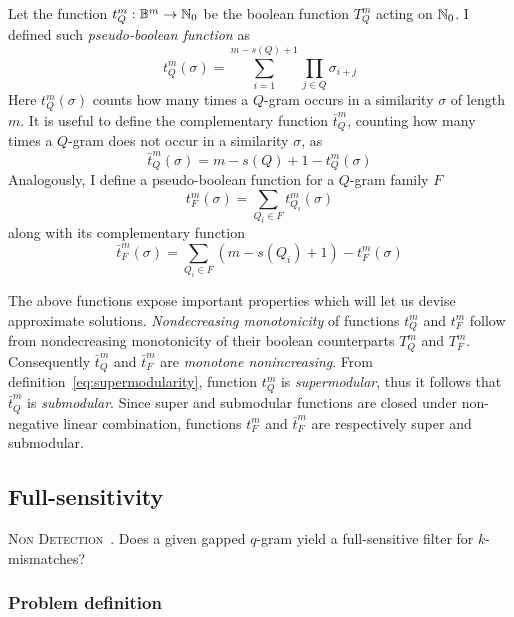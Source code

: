 Let the function $t_{Q}^{m}: \mathbb {B}^m \rightarrow \mathbb {N}_0$ be the boolean function $T_{Q}^{m}$ acting on $\mathbb {N}_0$.
I defined such \emph{pseudo-boolean function} as
\begin{equation}
\label{eq:qgram-pseudo}
t_{Q}^{m}(\sigma) = \sum_{i=1}^{m-s(Q)+1} \prod_{j \in Q}\sigma_{i+j}
\end{equation}
Here $t_{Q}^{m}(\sigma)$ counts how many times a $Q$-gram occurs in a similarity $\sigma$ of length $m$.
It is useful to define the complementary function $\bar{t}_{Q}^{m}$, counting how many times a $Q$-gram does not occur in a similarity $\sigma$, as
\begin{equation}
\label{eq:qgram-pseudoneg}
\bar{t}_{Q}^{m}(\sigma) = m - s(Q) + 1 - t_{Q}^{m}(\sigma)
\end{equation}
Analogously, I define a pseudo-boolean function for a $Q$-gram family $F$
\begin{equation}
\label{eq:family-pseudo}
t_{F}^{m}(\sigma) = \sum_{Q_i \in F} t_{Q_i}^{m}(\sigma)
\end{equation}
along with its complementary function
\begin{equation}
\label{eq:family-pseudoneg}
\bar{t}_{F}^{m}(\sigma) = \sum_{Q_i \in F}{(m - s(Q_i) + 1)} - t_{F}^{m}(\sigma)
\end{equation}

The above functions expose important properties which will let us devise approximate solutions.
\emph{Nondecreasing monotonicity} of functions $t_{Q}^{m}$ and $t_{F}^{m}$ follow from nondecreasing monotonicity of their boolean counterparts $T_{Q}^{m}$ and $T_{F}^{m}$. Consequently $\bar{t}_{Q}^{m}$ and $\bar{t}_{F}^{m}$ are \emph{monotone nonincreasing}.
From definition~\ref{eq:supermodularity}, function $t_{Q}^{m}$ is \emph{supermodular}, thus it follows that $\bar{t}_{Q}^{m}$ is \emph{submodular}.
Since super and submodular functions are closed under non-negative linear combination, functions $t_{F}^{m}$ and $\bar{t}_{F}^{m}$ are respectively super and submodular.

\subsection{Full-sensitivity}

\textsc{Non Detection}~\citep{Nicolas2005}. Does a given gapped $q$-gram yield a full-sensitive filter for $k$-mismatches?

\subsubsection{Problem definition}

